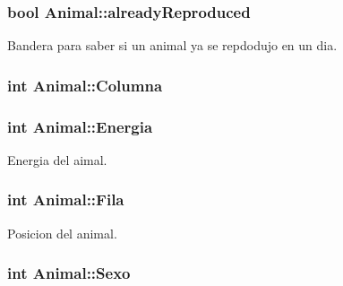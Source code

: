 \subsubsection[{\texorpdfstring{already\+Reproduced}{alreadyReproduced}}]{\setlength{\rightskip}{0pt plus 5cm}bool Animal\+::already\+Reproduced}\hypertarget{classAnimal_ab08fe103b56326ac66c63b0f38585c4c}{}\label{classAnimal_ab08fe103b56326ac66c63b0f38585c4c}


Bandera para saber si un animal ya se repdodujo en un dia. 

\subsubsection[{\texorpdfstring{Columna}{Columna}}]{\setlength{\rightskip}{0pt plus 5cm}int Animal\+::\+Columna}\hypertarget{classAnimal_a340d64e6e4ffe5f35e0855c63aad1bd3}{}\label{classAnimal_a340d64e6e4ffe5f35e0855c63aad1bd3}
\subsubsection[{\texorpdfstring{Energia}{Energia}}]{\setlength{\rightskip}{0pt plus 5cm}int Animal\+::\+Energia}\hypertarget{classAnimal_af1c30573e35f61baa10094579c5e741a}{}\label{classAnimal_af1c30573e35f61baa10094579c5e741a}


Energia del aimal. 

\subsubsection[{\texorpdfstring{Fila}{Fila}}]{\setlength{\rightskip}{0pt plus 5cm}int Animal\+::\+Fila}\hypertarget{classAnimal_ab403adfd13b57143eff123bdd6a2febb}{}\label{classAnimal_ab403adfd13b57143eff123bdd6a2febb}


Posicion del animal. 

\subsubsection[{\texorpdfstring{Sexo}{Sexo}}]{\setlength{\rightskip}{0pt plus 5cm}int Animal\+::\+Sexo}\hypertarget{classAnimal_a42b629ae5a7e0c05263a3f6e592ea116}{}\label{classAnimal_a42b629ae5a7e0c05263a3f6e592ea116}


